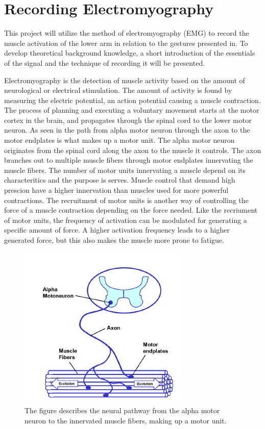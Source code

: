 

\section{Recording Electromyography}

This project will utilize the method of electromyography (EMG) to record the muscle activation of the lower arm in relation to the gestures presented in. To develop theoretical background knowledge, a short introduction of the essentials of the signal and the technique of recording it will be presented. 


Electromyography is the detection of muscle activity based on the amount of neurological or electrical stimulation. The amount of activity is found by measuring the electric potential, an action potential causing a muscle contraction. The process of planning and executing a voluntary movement starts at the motor cortex in the brain, and propagates through the spinal cord to the lower motor neuron. As seen in  the path from alpha motor neuron through the axon to the motor endplates is what makes up a motor unit. The alpha motor neuron originates from the spinal cord along the axon to the muscle it controls. The axon branches out to multiple muscle fibers through motor endplates innervating the muscle fibers. The number of motor units innervating a muscle depend on its characteritics and the purpose is serves. Muscle control that demand high prescion have a higher innervation than muscles used for more powerful contractions. The recruitment of motor units is another way of controlling the force of a muscle contraction depending on the force needed. Like the recriument of motor units, the frequency of activation can be modulated for generating a specific amount of force. A higher activation frequency leads to a higher generated force, but this also makes the muscle more prone to fatigue.\cite{Cram2012,Martini2012}       

\begin{figure}[H]                                         
	\includegraphics[width=.4\textwidth]{figures/motor_unit}  
	\caption{The figure describes the neural pathway from the alpha motor neuron to the innervated muscle fibers, making up a motor unit. \cite{Konrad2005}}
	\label{fig:motor} 
\end{figure}  

